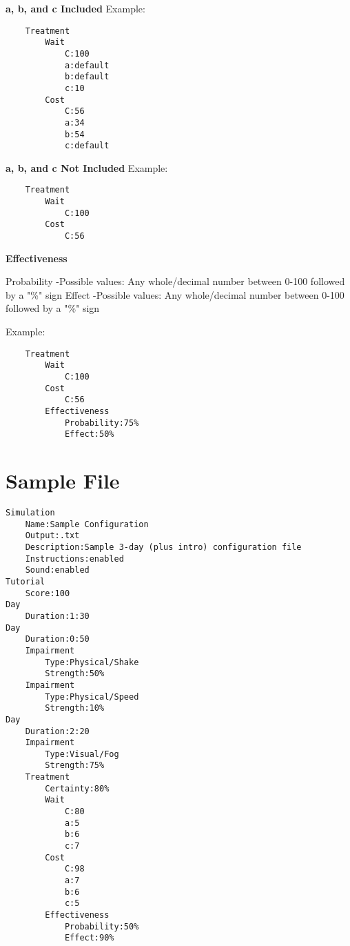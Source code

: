 \documentclass{article}
\begin{document}
\noindent \textbf{a, b, and c Included} \newline
\noindent Example:
\begin{lstlisting}
    Treatment
        Wait
            C:100
            a:default
            b:default
            c:10
        Cost
            C:56
            a:34
            b:54
            c:default
 \end{lstlisting}   
 \noindent \textbf{a, b, and c Not Included} \newline
 \noindent Example:
 \begin{lstlisting}
    Treatment
        Wait
            C:100
        Cost
            C:56
 \end{lstlisting} 
 
\noindent \textbf{Effectiveness} 
    
\noindent Probability\newline
\indent-Possible values:\newline
\indent\indent Any whole/decimal number between 0-100 followed by a "\%" sign \newline
\noindent Effect\newline
\indent-Possible values:\newline
\indent\indent Any whole/decimal number between 0-100 followed by a "\%" sign \newline
    
\noindent Example: 
\begin{lstlisting}
    Treatment
        Wait
            C:100
        Cost
            C:56
        Effectiveness
            Probability:75%
            Effect:50%
\end{lstlisting}
    
    
\section{Sample File}
\begin{lstlisting}
Simulation
    Name:Sample Configuration
    Output:.txt
    Description:Sample 3-day (plus intro) configuration file  
    Instructions:enabled
    Sound:enabled
Tutorial
    Score:100
Day
    Duration:1:30
Day
    Duration:0:50
    Impairment
        Type:Physical/Shake
        Strength:50%
    Impairment
        Type:Physical/Speed
        Strength:10%
Day
    Duration:2:20
    Impairment
        Type:Visual/Fog
        Strength:75%
    Treatment
        Certainty:80%
        Wait
            C:80
            a:5
            b:6
            c:7
        Cost
            C:98
            a:7
            b:6
            c:5
        Effectiveness
            Probability:50%
            Effect:90%
\end{lstlisting}    
\end{document}
